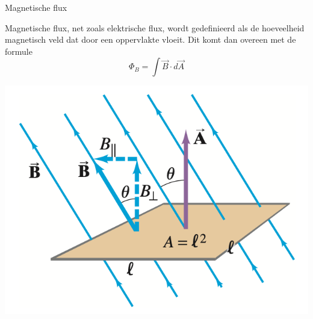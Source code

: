 \begin{theo}{Magnetische flux}
    \vspace{-0.4cm}
    \begin{minipage}{0.77\textwidth}
        Magnetische flux, net zoals elektrische flux, wordt gedefinieerd als de hoeveelheid magnetisch veld dat door een oppervlakte vloeit.
        Dit komt dan overeen met de formule 
        \begin{equation*}
            \Phi_{B} = \int \Vec{B} \cdot d\Vec{A}
        \end{equation*}
    \end{minipage}
    \begin{minipage}{0.19\textwidth}
        \includegraphics[scale=0.30]{Images/Magnetisme/Faraday.png}
    \end{minipage}
    \vspace{-0.3cm}
\end{theo}
    
\newpage

